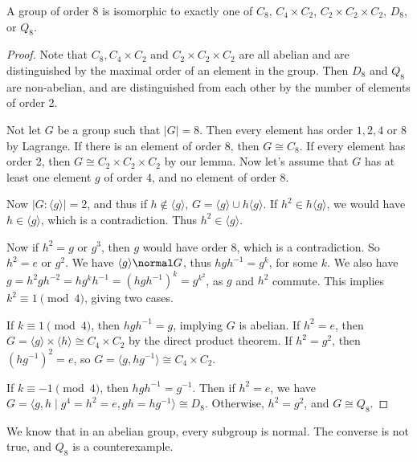 \documentclass[a4paper]{scrartcl}
\begin{document}
\begin{theorem}
	A group of order 8 is isomorphic to exactly one of $C_8$, $C_4 \times C_2$, $C_2 \times C_2 \times C_2$, $D_8$, or $Q_8$.
\end{theorem}
\begin{proof}
	Note that $C_8, C_4 \times C_2$ and $C_2 \times C_2 \times C_2$ are all abelian and are distinguished by the maximal order of an element in the group. Then $D_8$ and $Q_8$ are non-abelian, and are distinguished from each other by the number of elements of order 2.

	Not let $G$ be a group such that $|G| = 8$. Then every element has order $1, 2, 4$ or $8$ by Lagrange. If there is an element of order 8, then $G \cong C_8$. If every element has order 2, then $G \cong C_2 \times C_2 \times C_2$ by our lemma. Now let's assume that $G$ has at least one element $g$ of order 4, and no element of order 8.

	Now $|G : \langle g \rangle| = 2$, and thus if $h \not \in \langle g \rangle$, $G = \langle g \rangle \cup h \langle g \rangle$. If $h^2 \in h \langle g \rangle$, we would have $h \in \langle g \rangle$, which is a contradiction. Thus $h^2 \in \langle g \rangle$.

	Now if $h^2 = g$ or $g^3$, then $g$ would have order 8, which is a contradiction. So $h^2 = e$ or $g^2$.
	We have $\langle g \rangle \normal G$, thus $hgh^{-1} = g^k$, for some $k$. We also have $g = h^2 g h^{-2} = h g^{k} h^{-1} = (hgh^{-1})^k = g^{k^2}$, as $g$ and $h^2$ commute. 
	This implies $k^2 \equiv 1 \pmod{4}$, giving two cases.

	If $k \equiv 1 \pmod{4}$, then $hgh^{-1} = g$, implying $G$ is abelian. If $h^2 = e$, then $G = \langle g \rangle \times \langle h \rangle \cong C_4 \times C_2$ by the direct product theorem. If $h^2 = g^2$,  then $(hg^{-1})^2 = e$, so $G = \langle g, hg^{-1} \rangle \cong C_4 \times C_2$.

	If $k \equiv -1 \pmod{4}$, then $hgh^{-1} = g^{-1}$. Then if $h^2 = e$, we have $G = \langle g, h \mid g^4 = h^2 = e, gh = hg^{-1} \rangle \cong D_8$. Otherwise, $h^2 = g^2$, and $G \cong Q_8$.
\end{proof}

\begin{remark}
	We know that in an abelian group, every subgroup is normal. The converse is not true, and $Q_8$ is a counterexample.
\end{remark}

\end{document}
